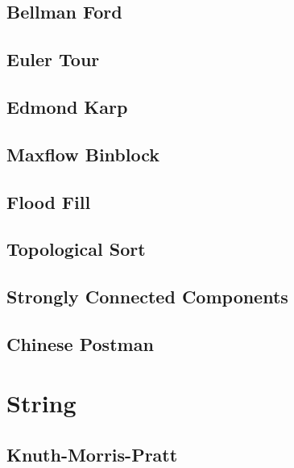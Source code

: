 \documentclass[a4paper,landscape,8pt]{article}
\begin{document}
\begin{multicols}{2}
\subsection{Bellman Ford}


\subsection{Euler Tour}


\subsection{Edmond Karp}


\subsection{Maxflow Binblock}


\subsection{Flood Fill}


\subsection{Topological Sort}


\subsection{Strongly Connected Components}


\subsection{Chinese Postman}



\section{String}

\subsection{Knuth-Morris-Pratt}



\end{multicols}
\end{document}
